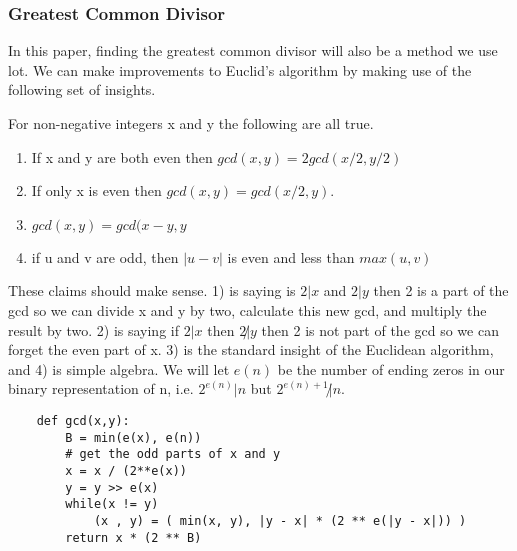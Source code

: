 \documentclass{article}
\begin{document}
\subsubsection{Greatest Common Divisor}
In this paper, finding the greatest common divisor will also be a method we use lot. We can make improvements to Euclid's algorithm by making use of the following set of insights.
\begin{theorem}
    For non-negative integers x and y the following are all true.
    \begin{enumerate}
        \item If x and y are both even then $gcd(x,y) = 2 gcd(x/2, y/2)$
        \item If only x is even then $gcd(x,y) = gcd(x/2, y)$.
        \item $gcd(x,y) = gcd(x-y, y$
        \item if u and v are odd, then $| u - v|$ is even and less than $max(u,v)$
    \end{enumerate}\cite{stein1967computational} \cite{knuth1997art}
\end{theorem}
These claims should make sense. 1) is saying is $2|x$ and $2|y$ then 2 is a part of the gcd so we can divide x and y by two, calculate this new gcd, and multiply the result by two. 2) is saying if $2| x$ then $2 \not | y$ then 2 is not part of the gcd so we can forget the even part of x. 3) is the standard insight of the Euclidean algorithm, and 4) is simple algebra. We will let $e(n)$ be the number of ending zeros in our binary representation of n, i.e. $2^{e(n)} | n$ but $2^{e(n) + 1} \not | n$.  
\begin{verbatim}
    def gcd(x,y):
        B = min(e(x), e(n))
        # get the odd parts of x and y
        x = x / (2**e(x))
        y = y >> e(x)
        while(x != y)
            (x , y) = ( min(x, y), |y - x| * (2 ** e(|y - x|)) )
        return x * (2 ** B)
\end{verbatim}
\end{document}
